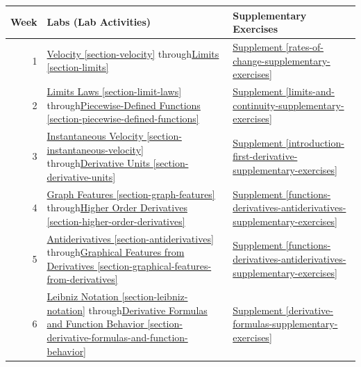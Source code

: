 \documentclass[12pt,]{book}
\theoremstyle{plain}
\theoremstyle{definition}
\numberwithin{equation}{section}
\begin{document}
\newline{}\begin{tabular}{rp{3in}p{1.1in}}
\toprule
Week&Labs (Lab Activities)&Supplementary Exercises\\
\midrule
1&\hyperref[section-velocity]{Velocity \ref{section-velocity}} through\newline{}\hyperref[section-limits]{Limits \ref{section-limits}}&\hyperref[rates-of-change-supplementary-exercises]{Supplement \ref{rates-of-change-supplementary-exercises}}\\
\midrule
2&\hyperref[section-limit-laws]{Limits Laws \ref{section-limit-laws}} through\newline{}\hyperref[section-piecewise-defined-functions]{Piecewise-Defined Functions \ref{section-piecewise-defined-functions}}&\hyperref[limits-and-continuity-supplementary-exercises]{Supplement \ref{limits-and-continuity-supplementary-exercises}}\\
\midrule
3&\hyperref[section-instantaneous-velocity]{Instantaneous Velocity \ref{section-instantaneous-velocity}} through\newline{}\hyperref[section-derivative-units]{Derivative Units \ref{section-derivative-units}}&\hyperref[introduction-first-derivative-supplementary-exercises]{Supplement \ref{introduction-first-derivative-supplementary-exercises}}\\
\midrule
4&\hyperref[section-graph-features]{Graph Features \ref{section-graph-features}} through\newline{}\hyperref[section-higher-order-derivatives]{Higher Order Derivatives \ref{section-higher-order-derivatives}}&\hyperref[functions-derivatives-antiderivatives-supplementary-exercises]{Supplement \ref{functions-derivatives-antiderivatives-supplementary-exercises}}\\
\midrule
5&\hyperref[section-antiderivatives]{Antiderivatives \ref{section-antiderivatives}} through\newline{}\hyperref[section-graphical-features-from-derivatives]{Graphical Features from Derivatives \ref{section-graphical-features-from-derivatives}}&\hyperref[functions-derivatives-antiderivatives-supplementary-exercises]{Supplement \ref{functions-derivatives-antiderivatives-supplementary-exercises}}\\
\midrule
6&\hyperref[section-leibniz-notation]{Leibniz Notation \ref{section-leibniz-notation}} through\newline{}\hyperref[section-derivative-formulas-and-function-behavior]{Derivative Formulas and Function Behavior \ref{section-derivative-formulas-and-function-behavior}}&\hyperref[derivative-formulas-supplementary-exercises]{Supplement \ref{derivative-formulas-supplementary-exercises}}\\

\end{tabular}
\end{document}
